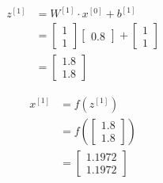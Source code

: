 \documentclass[12pt]{article}
\begin{document}
\begin{enumerate}[leftmargin=\labelsep]
\begin{paracol}{3}
              $$
                  \begin{aligned}
                      z^{[1]} & = W^{[1]} \cdot x^{[0]} + b^{[1]} \\
                              & = \begin{bmatrix}
                                      1 \\
                                      1
                                  \end{bmatrix}
                      \begin{bmatrix}
                          0.8
                      \end{bmatrix}
                      +
                      \begin{bmatrix}
                          1 \\
                          1
                      \end{bmatrix}                              \\
                              & = \begin{bmatrix}{}
                                      1.8 \\
                                      1.8
                                  \end{bmatrix}
                  \end{aligned}
              $$

              $$
                  \begin{aligned}
                      x^{[1]} & = f(z^{[1]})                  \\
                              & = f\left(\begin{bmatrix}{}
                                                 1.8 \\
                                                 1.8
                                             \end{bmatrix}\right) \\
                              & = \begin{bmatrix}{}
                                      1.1972 \\
                                      1.1972
                                  \end{bmatrix}
                  \end{aligned}
              $$


\end{paracol}
\end{enumerate}
\end{document}
